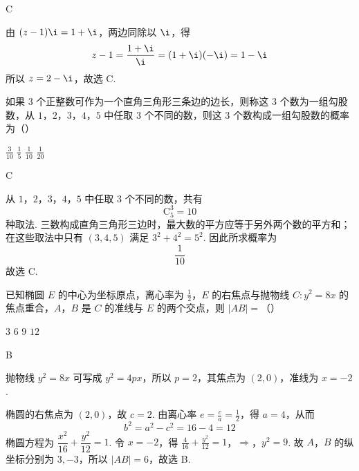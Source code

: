 \begin{answer}
C
\end{answer}

\begin{solution}
由 \((z-1)\i=1+\i\)，两边同除以 \(\i\)，得
\[
z-1=\frac{1+\i}{\i}=(1+\i)(-\i)=1-\i
\]
所以 \(z=2-\i\)，故选 C.
\end{solution}

\begin{problem}
如果 \(3\) 个正整数可作为一个直角三角形三条边的边长，则称这 \(3\) 个数为一组勾股数，从 \(1\)，\(2\)，\(3\)，\(4\)，\(5\) 中任取 \(3\) 个不同的数，则这 \(3\) 个数构成一组勾股数的概率为（\quad）

\choices
    {\(\frac{3}{10}\)}
    {\(\frac{1}{5}\)}
    {\(\frac{1}{10}\)}
    {\(\frac{1}{20}\)}
\end{problem}

\begin{answer}
C
\end{answer}

\begin{solution}
从 \(1\)，\(2\)，\(3\)，\(4\)，\(5\) 中任取 \(3\) 个不同的数，共有
\[
\mathrm C_5^3=10
\]
种取法. 三数构成直角三角形三边时，最大数的平方应等于另外两个数的平方和；在这些取法中只有 \((3,4,5)\) 满足 \(3^{2}+4^{2}=5^{2}\). 因此所求概率为
\[
\frac{1}{10}
\]
故选 C.
\end{solution}

\begin{problem}
已知椭圆 \(E\) 的中心为坐标原点，离心率为 \(\frac{1}{2}\)，\(E\) 的右焦点与抛物线 \(C: y^2 = 8x\) 的焦点重合，\(A\)，\(B\) 是 \(C\) 的准线与 \(E\) 的两个交点，则 \(|AB| =\)（\quad）

\choices
    {\(3\)}
    {\(6\)}
    {\(9\)}
    {\(12\)}
\end{problem}

\begin{answer}
B
\end{answer}

\begin{solution}
抛物线 \(y^{2}=8x\) 可写成 \(y^{2}=4px\)，所以 \(p=2\)，其焦点为 \((2,0)\)，准线为 \(x=-2\).

椭圆的右焦点为 \((2,0)\)，故 \(c=2\). 由离心率 \(e=\frac{c}{a}=\frac{1}{2}\)，得 \(a=4\)，从而
\[
b^{2}=a^{2}-c^{2}=16-4=12
\]
椭圆方程为 \(\dfrac{x^{2}}{16}+\dfrac{y^{2}}{12}=1\). 令 \(x=-2\)，得
\(\frac{4}{16}+\frac{y^{2}}{12}=1\)，\(\Longrightarrow\)，\(y^{2}=9\).
故 \(A\)，\(B\) 的纵坐标分别为 \(3,-3\)，所以 \(|AB|=6\)，故选 B.
\end{solution}

